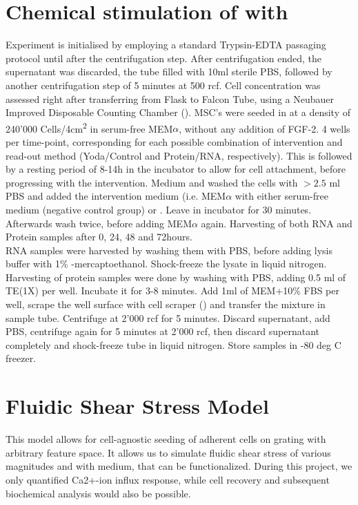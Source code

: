 \section{Chemical stimulation of \Piezo with \Yoda}
Experiment is initialised by employing a standard Trypsin-EDTA passaging protocol until after the centrifugation step. After centrifugation ended, the supernatant was discarded, the tube filled with 10ml sterile PBS, followed by another centrifugation step of 5 minutes at 500 rcf. Cell concentration was assessed right after transferring from Flask to Falcon Tube, using a Neubauer Improved Disposable Counting Chamber (). 
MSC's were seeded in  at a density of 240'000 Cells/4cm\textsuperscript{2} in serum-free MEM$\alpha$, without any addition of FGF-2. 4 wells per time-point, corresponding for each possible combination of  intervention and read-out method (Yoda/Control and Protein/RNA, respectively). This is followed by a resting period of 8-14h in the incubator to allow for cell attachment, before progressing with the intervention.
Medium  and washed the cells with $> 2.5$ ml PBS and added the intervention medium (i.e. MEM$\alpha$ with either serum-free medium (negative control group) or  \Yoda. Leave in incubator for 30 minutes. Afterwards wash twice, before adding MEM$\alpha$ again. Harvesting of both RNA and Protein samples after 0, 24, 48 and 72hours.\\ 
RNA samples were harvested by washing them with PBS, before adding lysis buffer with 1\% \textbeta-mercaptoethanol. Shock-freeze the lysate in liquid nitrogen. Harvesting of protein samples were done by washing with PBS, adding 0.5 ml of TE(1X) per well. Incubate it for 3-8 minutes. Add 1ml of MEM\textalpha{ }+10\% FBS per well, scrape the well surface with cell scraper () and transfer the mixture in sample tube. Centrifuge at 2'000 rcf for 5 minutes. Discard supernatant, add PBS, centrifuge again for 5 minutes at 2'000 rcf, then discard supernatant completely and shock-freeze tube in liquid nitrogen. Store samples in -80 deg C freezer.


\section{Fluidic Shear Stress Model}

This model allows for cell-agnostic seeding of adherent cells on grating with arbitrary feature space. It allows us to simulate fluidic shear stress of various magnitudes and with medium, that can be functionalized. During this project, we only quantified Ca2+-ion influx response, while cell recovery and subsequent biochemical analysis would also be possible. 

